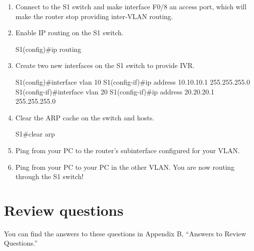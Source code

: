 \begin{enumerate}
\item
  Connect to the S1 switch and make interface F0/8 an access port, which
  will make the router stop providing inter-VLAN routing.
\item
  Enable IP routing on the S1 switch.

\begin{cli}
S1(config)#ip routing
\end{cli}
\item
  Create two new interfaces on the S1 switch to provide IVR.

\begin{cli}
S1(config)#interface vlan 10
S1(config-if)#ip address 10.10.10.1 255.255.255.0
S1(config-if)#interface vlan 20
S1(config-if)#ip address 20.20.20.1 255.255.255.0
\end{cli}
\item
  Clear the ARP cache on the switch and hosts.

\begin{cli}
S1#clear arp
\end{cli}
\item
  Ping from your PC to the router's subinterface configured for your
  VLAN.
\item
  Ping from your PC to your PC in the other VLAN. You are now routing
  through the S1 switch!
\end{enumerate}




\section{Review questions}

You can find the answers to these questions in Appendix B, ``Answers to Review Questions.''

